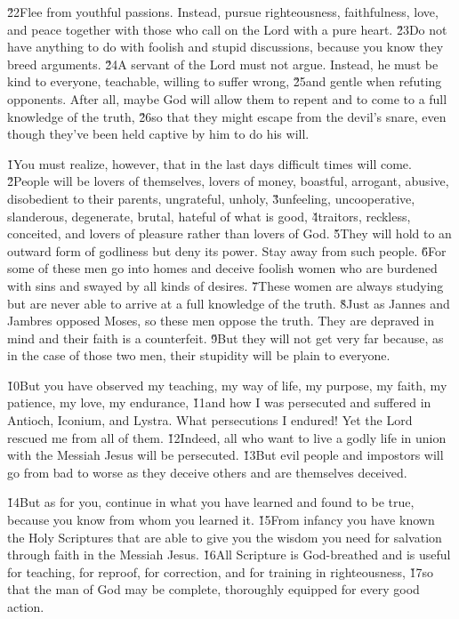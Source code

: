 \v{22}Flee from youthful passions. Instead, pursue righteousness, faithfulness, love, and peace together with those who call on the Lord with a pure heart. \v{23}Do not have anything to do with foolish and stupid discussions, because you know they breed arguments. \v{24}A servant of the Lord must not argue. Instead, he must be kind to everyone, teachable, willing to suffer wrong, \v{25}and gentle when refuting opponents. After all, maybe God will allow them to repent and to come to a full knowledge of the truth, \v{26}so that they might escape from the devil's snare, even though they've been held captive by him to do his will.

\v{1}You must realize, however, that in the last days difficult times will come. \v{2}People will be lovers of themselves, lovers of money, boastful, arrogant, abusive, disobedient to their parents, ungrateful, unholy, \v{3}unfeeling, uncooperative, slanderous, degenerate, brutal, hateful of what is good, \v{4}traitors, reckless, conceited, and lovers of pleasure rather than lovers of God. \v{5}They will hold to an outward form of godliness but deny its power. Stay away from such people. \v{6}For some of these men go into homes and deceive foolish women who are burdened with sins and swayed by all kinds of desires. \v{7}These women are always studying but are never able to arrive at a full knowledge of the truth. \v{8}Just as Jannes and Jambres opposed Moses, so these men oppose the truth. They are depraved in mind and their faith is a counterfeit. \v{9}But they will not get very far because, as in the case of those two men, their stupidity will be plain to everyone.

\v{10}But you have observed my teaching, my way of life, my purpose, my faith, my patience, my love, my endurance, \v{11}and how I was persecuted and suffered in Antioch, Iconium, and Lystra. What persecutions I endured! Yet the Lord rescued me from all of them. \v{12}Indeed, all who want to live a godly life in union with the Messiah Jesus will be persecuted. \v{13}But evil people and impostors will go from bad to worse as they deceive others and are themselves deceived.

\v{14}But as for you, continue in what you have learned and found to be true, because you know from whom you learned it. \v{15}From infancy you have known the Holy Scriptures that are able to give you the wisdom you need for salvation through faith in the Messiah Jesus. \v{16}All Scripture is God-breathed and is useful for teaching, for reproof, for correction, and for training in righteousness, \v{17}so that the man of God may be complete, thoroughly equipped for every good action.

